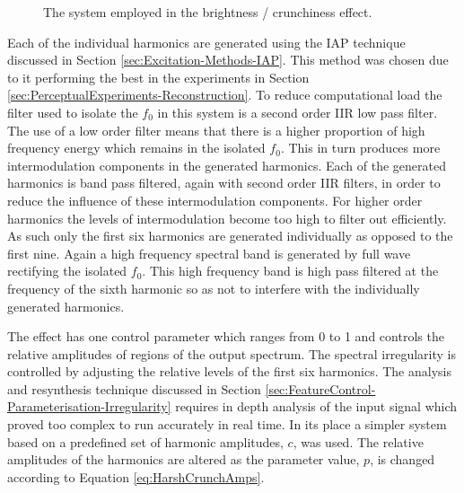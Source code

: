\begin{figure}[h!]
				\caption{The system employed in the brightness / crunchiness effect.}
				\label{fig:HarshCrunch}
			\end{figure}

			Each of the individual harmonics are generated using the IAP technique discussed in Section
			\ref{sec:Excitation-Methods-IAP}. This method was chosen due to it performing the best in the
			experiments in Section \ref{sec:PerceptualExperiments-Reconstruction}. To reduce computational load
			the filter used to isolate the $f_{0}$ in this system is a second order IIR low pass filter.  The
			use of a low order filter means that there is a higher proportion of high frequency energy which
			remains in the isolated $f_{0}$. This in turn produces more intermodulation components in the
			generated harmonics. Each of the generated harmonics is band pass filtered, again with second order
			IIR filters, in order to reduce the influence of these intermodulation components. For higher order
			harmonics the levels of intermodulation become too high to filter out efficiently. As such only the
			first six harmonics are generated individually as opposed to the first nine. Again a high frequency
			spectral band is generated by full wave rectifying the isolated $f_{0}$. This high frequency band
			is high pass filtered at the frequency of the sixth harmonic so as not to interfere with the
			individually generated harmonics.

			The effect has one control parameter which ranges from 0 to 1 and controls the relative amplitudes
			of regions of the output spectrum. The spectral irregularity is controlled by adjusting the
			relative levels of the first six harmonics. The analysis and resynthesis technique discussed in
			Section \ref{sec:FeatureControl-Parameterisation-Irregularity} requires in depth analysis of the
			input signal which proved too complex to run accurately in real time. In its place a simpler system
			based on a predefined set of harmonic amplitudes, $c$, was used. The relative amplitudes of the
			harmonics are altered as the parameter value, $p$, is changed according to Equation
			\ref{eq:HarshCrunchAmps}.

